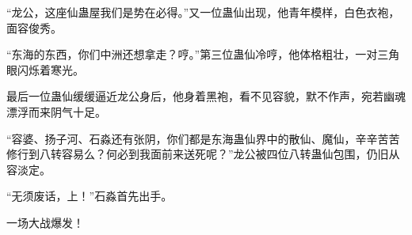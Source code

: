 \begin{this_body}
“龙公，这座仙蛊屋我们是势在必得。”又一位蛊仙出现，他青年模样，白色衣袍，面容俊秀。

“东海的东西，你们中洲还想拿走？哼。”第三位蛊仙冷哼，他体格粗壮，一对三角眼闪烁着寒光。

最后一位蛊仙缓缓逼近龙公身后，他身着黑袍，看不见容貌，默不作声，宛若幽魂漂浮而来阴气十足。

“容婆、扬子河、石淼还有张阴，你们都是东海蛊仙界中的散仙、魔仙，辛辛苦苦修行到八转容易么？何必到我面前来送死呢？”龙公被四位八转蛊仙包围，仍旧从容淡定。

“无须废话，上！”石淼首先出手。

一场大战爆发！

\end{this_body}

